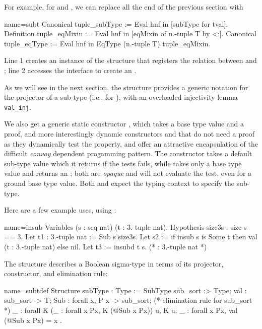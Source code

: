 For example, for  and , we can replace all the end of the
previous section with

\begin{coq}{name=subt}{}
Canonical tuple_subType := Eval hnf in [subType for tval].
Definition tuple_eqMixin := Eval hnf in [eqMixin of n.-tuple T by <:].
Canonical tuple_eqType := Eval hnf in EqType (n.-tuple T) tuple_eqMixin.
\end{coq}

Line 1 creates an instance of the  structure that registers the
relation between  and ; line 2 accesses the 
interface to create an .

As we will see in the next section, the  structure provides
a generic notation  for the projector of a sub-type (i.e.,
 for ),
with an overloaded injectivity lemma \lstinline/val_inj/.

We also get a generic static constructor , which takes a base
type value and a proof, and more interestingly dynamic constructors
 and  that do not need a proof as they dynamically
test the property, and offer an attractive encapsulation of the
difficult \emph{convoy} dependent progamming pattern. The 
constructor takes a default sub-type value which it returns if the
tests fails, while  takes only a base type value and returns
an ; both are \emph{opaque} and will not evaluate the test,
even for a ground base type value.  Both  and  expect
the typing context to specify the sub-type.

Here are a few example uses, using :

\begin{coq}{name=insub}{}
Variables (s : seq nat) (t : 3.-tuple nat).
Hypothesis size3s : size s == 3.
Let t1 : 3.-tuple nat := Sub s size3s.
Let s2 := if insub s is Some t then val (t : 3.-tuple nat) else nil.
Let t3 := insubd t s. (* : 3.-tuple nat *)
\end{coq}

The  structure describes a Boolean sigma-type in terms of
its projector, constructor, and elimination rule:

\begin{coq}{name=subtdef}{}
Structure subType : Type := SubType {
  sub_sort :> Type;
  val : sub_sort -> T;
  Sub : forall x, P x -> sub_sort;
  (* elimination rule for sub_sort *)
  _ : forall K (_ : forall x Px, K (@Sub x Px)) u, K u;
  _ : forall x Px, val (@Sub x Px) = x
}.
\end{coq}

